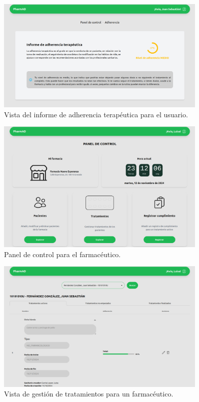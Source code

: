 \begin{figure}[h!]
	\centering
	\includegraphics[width=0.9\textwidth]{imagenes/adherencia.png}
	\caption{Vista del informe de adherencia terapéutica para el usuario.}
\end{figure}


\begin{figure}[h!]
	\centering
	\includegraphics[width=0.9\textwidth]{imagenes/farmaceutico.png}
	\caption{Panel de control para el farmacéutico.}
\end{figure}

\begin{figure}[h!]
	\centering
	\includegraphics[width=0.9\textwidth]{imagenes/gestionarTratamientos.png}
	\caption{Vista de gestión de tratamientos para un farmacéutico.}
\end{figure}












